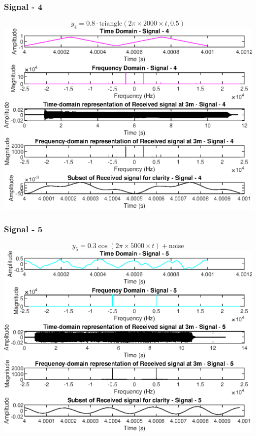 \documentclass{report}
\begin{document}
\newpage
\subsubsection{Signal - 4}

$$ y_4 = 0.8 \cdot \text{triangle}(2 \pi \times 2000 \times t, 0.5) $$
\includegraphics[width=1.1\linewidth]{3_4.eps}


\newpage
\subsubsection{Signal - 5}

$$ y_5 = 0.3 \cos(2\pi \times 5000 \times t) + \text{noise} $$
\includegraphics[width=1.1\linewidth]{3_5.eps}
\end{document}

